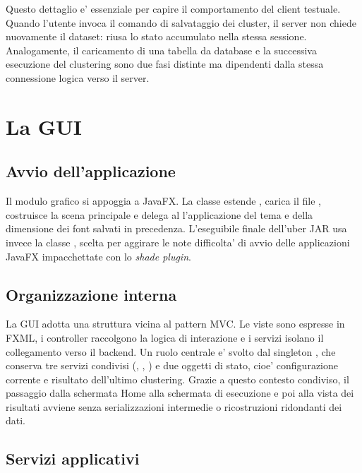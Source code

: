 Questo dettaglio e' essenziale per capire il comportamento del client testuale. Quando
l'utente invoca il comando di salvataggio dei cluster, il server non chiede nuovamente il
dataset: riusa lo stato accumulato nella stessa sessione. Analogamente, il caricamento di
una tabella da database e la successiva esecuzione del clustering sono due fasi distinte
ma dipendenti dalla stessa connessione logica verso il server.

\section{La GUI }

\subsection{Avvio dell'applicazione}

Il modulo grafico si appoggia a JavaFX. La classe  estende
, carica il file , costruisce la scena
principale e delega al  l'applicazione del tema e della dimensione
dei font salvati in precedenza. L'eseguibile finale dell'uber JAR usa invece la classe
, scelta per aggirare le note difficolta' di avvio delle applicazioni
JavaFX impacchettate con lo \emph{shade plugin}.

\subsection{Organizzazione interna}

La GUI adotta una struttura vicina al pattern MVC. Le viste sono espresse in FXML, i
controller raccolgono la logica di interazione e i servizi isolano il collegamento verso
il backend. Un ruolo centrale e' svolto dal singleton , che
conserva tre servizi condivisi (, ,
) e due oggetti di stato, cioe' configurazione corrente e risultato
dell'ultimo clustering. Grazie a questo contesto condiviso, il passaggio dalla schermata
Home alla schermata di esecuzione e poi alla vista dei risultati avviene senza
serializzazioni intermedie o ricostruzioni ridondanti dei dati.

\subsection{Servizi applicativi}

